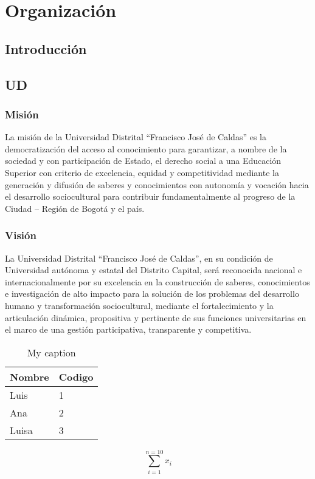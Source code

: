\chapter{Organización}
\section{Introducción}
\newpage
\section{UD}

\subsection{Misión}
La misión de la Universidad Distrital “Francisco José de Caldas” es la democratización del acceso al conocimiento para garantizar, a nombre de la sociedad y con participación de Estado, el derecho social a una Educación Superior con criterio de excelencia, equidad y competitividad mediante la generación y difusión de saberes y conocimientos con autonomía y vocación hacia el desarrollo sociocultural para contribuir fundamentalmente al progreso de la Ciudad – Región de Bogotá y el país.

\subsection{Visión}

La Universidad Distrital “Francisco José de Caldas”, en su condición de Universidad autónoma y estatal del Distrito Capital, será reconocida nacional e internacionalmente por su excelencia en la construcción de saberes, conocimientos e investigación de alto impacto para la solución de los problemas del desarrollo humano y transformación sociocultural, mediante el fortalecimiento y la articulación dinámica, propositiva y pertinente de sus funciones universitarias en el marco de una gestión participativa, transparente y competitiva.


\begin{table}[h!]
	\centering
	\caption{My caption}
	\label{my-label}
	\begin{tabular}{|l|l|}
		\hline
		Nombre & Codigo \\ \hline
		Luis   & 1      \\ \hline
		Ana    & 2      \\ \hline
		Luisa  & 3      \\ \hline
	\end{tabular}
\end{table}

\begin{equation}
	\sum_{i=1}^{n=10} x_{i}
\end{equation}